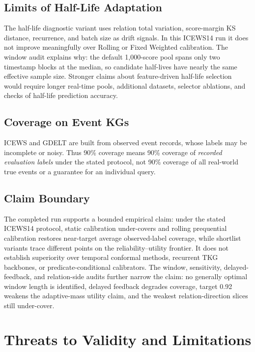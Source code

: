 \documentclass[10pt,twocolumn]{article}
\begin{document}
\subsection{Limits of Half-Life Adaptation}

The half-life diagnostic variant uses relation total variation, score-margin KS
distance, recurrence, and batch size as drift signals. In this ICEWS14 run it
does not improve meaningfully over Rolling or Fixed Weighted calibration. The
window audit explains why: the default 1,000-score pool spans only two
timestamp blocks at the median, so candidate half-lives have nearly the same
effective sample size. Stronger claims about feature-driven half-life selection
would require longer real-time pools, additional datasets, selector ablations,
and checks of half-life prediction accuracy.

\subsection{Coverage on Event KGs}

ICEWS and GDELT are built from observed event records, whose labels may be
incomplete or noisy. Thus 90\% coverage means 90\% coverage of
\emph{recorded evaluation labels} under the stated protocol, not 90\% coverage
of all real-world true events or a guarantee for an individual query.

\subsection{Claim Boundary}

The completed run supports a bounded empirical claim: under the stated ICEWS14
protocol, static calibration under-covers and rolling prequential calibration
restores near-target average observed-label coverage, while shortlist variants
trace different points on the reliability--utility frontier. It does not
establish superiority over temporal conformal methods, recurrent TKG backbones,
or predicate-conditional calibrators. The window, sensitivity, delayed-feedback,
and relation-side audits further narrow the claim: no generally optimal window
length is identified, delayed feedback degrades coverage, target 0.92 weakens
the adaptive-mass utility claim, and the weakest relation-direction slices still
under-cover.

\section{Threats to Validity and Limitations}
\label{sec:limitations}
\end{document}
